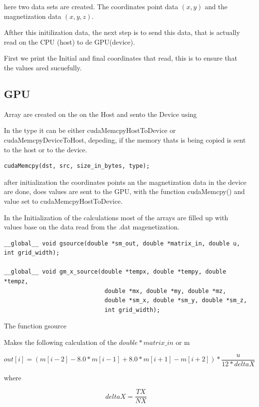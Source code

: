 here two data sets are created. The coordinates point data $(x,y)$ and the magnetization data $(x, y, z)$.

Afther this initilization data, the next step is to send this data, that is actually read on the CPU (host) to de GPU(device). 


First we print the Initial and final coordinates that read, this is to ensure that the values ared sucuefully.


\subsection{GPU}


Array are created on the on the Host and sento the Device using

In the type it can be either cudaMemcpyHostToDevice or cudaMemcpyDeviceToHost, depeding, if the memory thats is being copied is sent to the host or to the device.

\begin{lstlisting}[frame=none]
cudaMemcpy(dst, src, size_in_bytes, type);
\end{lstlisting}

after initialization the coordinates points an the magnetization data in the device are done, does values are sent to the GPU, with the function cudaMemcpy() and value set to cudaMemcpyHostToDevice.

In the Initialization of the calculations most of the arrays are filled up with values base on the data read from the .dat magenetization.

\begin{lstlisting}[frame=none]
__global__ void gsource(double *sm_out, double *matrix_in, double u, int grid_width);

__global__ void gm_x_source(double *tempx, double *tempy, double *tempz,
							 double *mx, double *my, double *mz,
							 double *sm_x, double *sm_y, double *sm_z,
							 int grid_width);
\end{lstlisting}


The function gsource

Makes the following calculation of the $double *matrix\_in$ or m


\begin{equation} \label{eq:gsource}
out[i] = (m[i-2] - 8.0*m[i-1] + 8.0*m[i+1] - m[i+2]) * \dfrac{u}{12 * deltaX }
\end{equation}

where

$$deltaX = \frac{TX}{NX}$$

